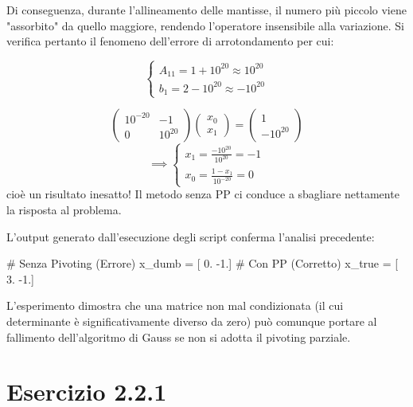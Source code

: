\begin{enumerate}[resume=miolista]
    Di conseguenza, durante l'allineamento delle mantisse, il numero più piccolo viene "assorbito" da quello maggiore, rendendo l'operatore insensibile alla variazione. Si verifica pertanto il fenomeno dell'errore di arrotondamento per cui:
    
    $$
    \begin{cases}
        A_{11} = 1+10^{20} \approx 10^{20}\\
        b_1 = 2-10^{20} \approx -10^{20}
    \end{cases}    
    $$    
    
    $$
        \begin{pmatrix}
            10^{-20} & -1 \\
            0 & 10^{20}
        \end{pmatrix}
        \begin{pmatrix}
            x_0 \\x_1
        \end{pmatrix} =
        \begin{pmatrix}
            1 \\ -10^{20}
        \end{pmatrix}
    $$
    $$
    \implies \begin{cases}
        x_1 = \frac{-10^{20}}{10^{20}} = -1 \\
        x_0 = \frac{1 - x_1}{10^{-20}} = 0 
    \end{cases}
    $$
    cioè un risultato inesatto! Il metodo senza PP ci conduce a sbagliare nettamente la risposta al problema.
        
    \noindent L'output generato dall'esecuzione degli script conferma l'analisi precedente:\\
    
    \begin{elegantcode}
# Senza Pivoting (Errore)
x_dumb = [ 0. -1.]
# Con PP (Corretto)
x_true = [ 3. -1.]
    \end{elegantcode}
    
    \noindent L'esperimento dimostra che una matrice non mal condizionata (il cui determinante è significativamente diverso da zero) può comunque portare al fallimento dell'algoritmo di Gauss se non si adotta il pivoting parziale.
    
\end{enumerate}
\newpage





\section{Esercizio 2.2.1}
\label{sec: poisson res}
